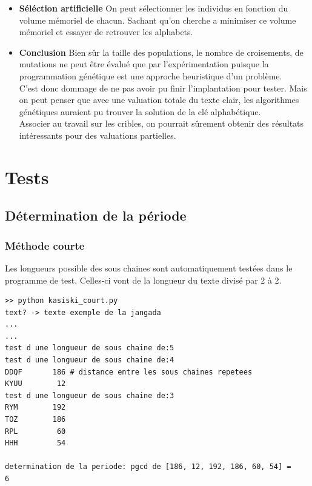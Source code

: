 \documentclass[a4paper, 11pt]{article}
\begin{document}
\begin{itemize}
\item \textbf{Séléction artificielle}
On peut sélectionner les individus en fonction du volume mémoriel de
chacun. Sachant qu'on cherche a minimiser ce volume mémoriel et
essayer de retrouver les alphabets.\\

\item \textbf{Conclusion}
Bien sûr la taille des populations, le nombre de croisements, de
mutations ne peut être évalué que par l'expérimentation puisque la
programmation génétique est une approche heuristique d'un problème.\\
C'est donc dommage de ne pas avoir pu finir l'implantation pour
tester. Mais on peut penser que avec une valuation totale du texte
clair, les algorithmes génétiques auraient pu trouver la solution de
la clé alphabétique.\\

Associer au travail sur les cribles, on pourrait sûrement
obtenir des résultats intéressants pour des valuations partielles.
\end{itemize}



\section{Tests}

\subsection{Détermination de la période}

\subsubsection{Méthode courte}

Les longueurs possible des sous chaines sont automatiquement testées
dans le programme de test.
Celles-ci vont de la longueur du texte divisé par 2 à 2.\\

\begin{lstlisting}
>> python kasiski_court.py
text? -> texte exemple de la jangada
...
...
test d une longueur de sous chaine de:5
test d une longueur de sous chaine de:4
DDQF       186 # distance entre les sous chaines repetees
KYUU        12
test d une longueur de sous chaine de:3
RYM        192
TOZ        186
RPL         60
HHH         54

determination de la periode: pgcd de [186, 12, 192, 186, 60, 54] =
6
\end{lstlisting}
\end{document}
